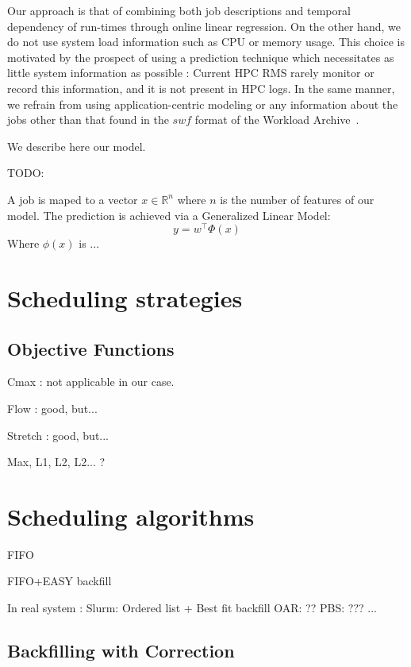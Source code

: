 \documentclass{llncs}
\begin{document}
Our approach is that of combining both job descriptions and temporal dependency of run-times through online linear regression.
On the other hand, we do not use system load information such as CPU or memory usage.
This choice is motivated by the prospect of using a prediction technique which necessitates as little system information as possible : Current HPC RMS rarely monitor or record this information, and it is not present in HPC logs.
In the same manner, we refrain from using application-centric modeling or any information about the jobs other than that found in the $swf$ format of the Workload Archive~\cite{workloadarchive}.

We describe here our model.

TODO:

A job is maped to a vector $x \in \mathbb{R}^{n}$ where $n$ is the number of features of our model.
The prediction is achieved via a Generalized Linear Model:
\[
  y = w^{\intercal} \Phi(x)
\]
Where $\phi(x)$ is ...




\section{Scheduling strategies}
\label{sec:scheduling_strategies}


\subsection{Objective Functions}
\label{sub:objective_functions}

Cmax : not applicable in our case.

Flow : good, but...

Stretch : good, but...

Max, L1, L2, L2... ?

\section{Scheduling algorithms}
\label{sec:scheduling_algorithms}

FIFO

FIFO+EASY backfill

In real system :
Slurm: Ordered list + Best fit backfill
OAR: ??
PBS: ???
...




\subsection{Backfilling with Correction}
\label{sub:backfilling_with_correction}
\end{document}
